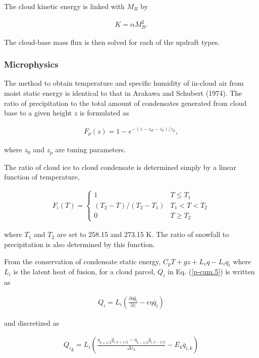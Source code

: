 The cloud kinetic energy is linked with \(M_B\) by

\begin{eqnarray}
 K = \alpha M_B^2.  \label{p-cum.9}
\end{eqnarray}

The cloud-base mass flux is then solved for each of the updraft types.

\hypertarget{microphysics}{%
\subsubsection{Microphysics}\label{microphysics}}

The method to obtain temperature and specific humidity of in-cloud air
from moist static energy is identical to that in Arakawa and Schubert
(1974). The ratio of precipitation to the total amount of condensates
generated from cloud base to a given height \(z\) is formulated as

\begin{eqnarray}
 F_p(z) = 1 - e^{-(z - z_B - z_0)/z_p},
\end{eqnarray}

where \(z_0\) and \(z_p\) are tuning parameters.

The ratio of cloud ice to cloud condensate is determined simply by a
linear function of temperature,

\begin{eqnarray}
 F_i(T) = \begin{cases} 1 & T \leq T_1 \\ (T_2 - T)/(T_2 - T_1) & T_1 < T < T_2 \\ 0  & T \geq T_2 \end{cases}
\end{eqnarray}

where \(T_1\) and \(T_2\) are set to 258.15 and 273.15 K. The ratio of
snowfall to precipitation is also determined by this function.

From the conservation of condensate static energy,
\(C_p T + gz + L_v q - L_i q_i\) where \(L_i\) is the latent heat of
fusion, for a cloud parcel, \(Q_i\) in Eq. (\ref{p-cum.5}) is
written as

\begin{eqnarray}
 Q_i = L_i \left(\frac{\partial \eta \hat{q}_i}{\partial z} - \epsilon\eta\bar{q}_i\right)
\end{eqnarray}

and discretized as

\begin{eqnarray}
 {Q_i}_k = L_i \left(\frac{\eta_{k+1/2} \hat{q}_{i,k+1/2} - \eta_{k-1/2} \hat{q}_{i,k-1/2}}{\Delta z_k} - E_k \bar{q}_{i,k} \right)
\end{eqnarray}

